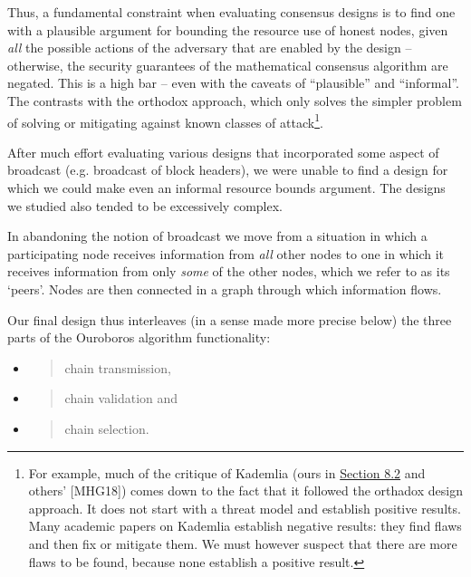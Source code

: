 \documentclass[]{article}
\begin{document}
Thus, a fundamental constraint when evaluating consensus designs is to
find one with a plausible argument for bounding the resource use of
honest nodes, given \emph{all} the possible actions of the adversary
that are enabled by the design -- otherwise, the security guarantees of
the mathematical consensus algorithm are negated. This is a high bar --
even with the caveats of ``plausible'' and ``informal''. The contrasts
with the orthodox approach, which only solves the simpler problem of
solving or mitigating against known classes of attack\footnote{For
  example, much of the critique of Kademlia (ours in
  \protect\hyperlink{kademlia}{{Section 8.2}} and others' {[}MHG18{]})
  comes down to the fact that it followed the orthadox design approach.
  It does not start with a threat model and establish positive results.
  Many academic papers on Kademlia establish negative results: they find
  flaws and then fix or mitigate them. We must however suspect that
  there are more flaws to be found, because none establish a positive
  result.}.

After much effort evaluating various designs that incorporated some
aspect of broadcast (e.g. broadcast of block headers), we were unable to
find a design for which we could make even an informal resource bounds
argument. The designs we studied also tended to be excessively complex.

In abandoning the notion of broadcast we move from a situation in which
a participating node receives information from \emph{all} other nodes to
one in which it receives information from only \emph{some} of the other
nodes, which we refer to as its `peers'. Nodes are then connected in a
graph through which information flows.

Our final design thus interleaves (in a sense made more precise below)
the three parts of the Ouroboros algorithm functionality:

\begin{itemize}
\item
  \begin{quote}
  chain transmission,
  \end{quote}
\item
  \begin{quote}
  chain validation and
  \end{quote}
\item
  \begin{quote}
  chain selection.
  \end{quote}
\end{itemize}
\end{document}
